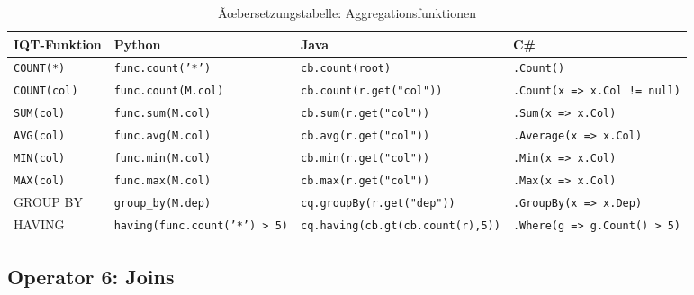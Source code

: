 \begin{table}
\centering
\caption{Ãœbersetzungstabelle: Aggregationsfunktionen}
\label{tab:agg_ops}
\renewcommand{\arraystretch}{1.4}
\begin{tabularx}{\textwidth}{lXXX}
\toprule
\textbf{IQT-Funktion} & \textbf{Python} & \textbf{Java} & \textbf{C\#} \\
\midrule
\texttt{COUNT(*)}
  & \texttt{func.count('*')}
  & \texttt{cb.count(root)}
  & \texttt{.Count()} \\
\texttt{COUNT(col)}
  & \texttt{func.count(M.col)}
  & \texttt{cb.count(r.get("col"))}
  & \texttt{.Count(x => x.Col != null)} \\
\texttt{SUM(col)}
  & \texttt{func.sum(M.col)}
  & \texttt{cb.sum(r.get("col"))}
  & \texttt{.Sum(x => x.Col)} \\
\texttt{AVG(col)}
  & \texttt{func.avg(M.col)}
  & \texttt{cb.avg(r.get("col"))}
  & \texttt{.Average(x => x.Col)} \\
\texttt{MIN(col)}
  & \texttt{func.min(M.col)}
  & \texttt{cb.min(r.get("col"))}
  & \texttt{.Min(x => x.Col)} \\
\texttt{MAX(col)}
  & \texttt{func.max(M.col)}
  & \texttt{cb.max(r.get("col"))}
  & \texttt{.Max(x => x.Col)} \\
GROUP BY
  & \texttt{group\_by(M.dep)}
  & \texttt{cq.groupBy(r.get("dep"))}
  & \texttt{.GroupBy(x => x.Dep)} \\
HAVING
  & \texttt{having(func.count('*') > 5)}
  & \texttt{cq.having(cb.gt(cb.count(r),5))}
  & \texttt{.Where(g => g.Count() > 5)} \\
\bottomrule
\end{tabularx}
\end{table}

\subsection{Operator 6: Joins}
\label{subsec:op_join}

